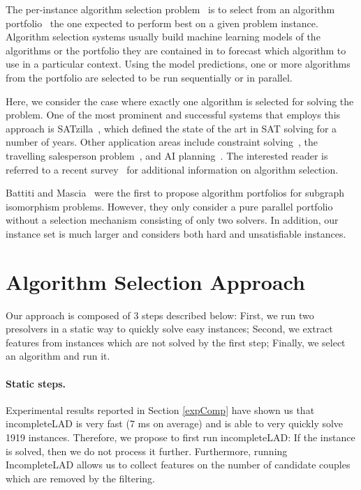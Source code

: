 \documentclass{llncs}
\begin{document}
The per-instance algorithm selection problem~\cite{rice_algorithm_1976} is to select from an
algorithm portfolio~\cite{huberman_economics_1997,gomes_algorithm_2001} the one expected to perform
best on a given problem instance. Algorithm selection systems usually build machine learning models
of the algorithms or the portfolio they are contained in to forecast which algorithm to use in a
particular context. Using the model predictions, one or more algorithms from the portfolio are
selected to be run sequentially or in parallel.

Here, we consider the case where exactly one algorithm is selected for solving the problem. One of
the most prominent and successful systems that employs this approach is
SATzilla~\cite{xu_satzilla_2008}, which defined the state of the art in SAT solving for a number of
years. Other application areas include constraint solving~\cite{omahony_using_2008}, the travelling
salesperson problem~\cite{kotthoff_improving_2015}, and AI planning~\cite{seipp_learning_2012}.
The interested reader is referred to a recent survey~\cite{kotthoff_algorithm_2014} for additional
information on algorithm selection.

\medskip

Battiti and Mascia~\cite{battiti-mascia07} were the first to propose
algorithm portfolios for subgraph isomorphism problems. However, they only
consider a pure parallel portfolio without a selection mechanism consisting of
only two solvers. In addition, our instance set is much larger and considers
both hard and unsatisfiable instances.

\section{Algorithm Selection Approach}

Our approach is composed of 3 steps described below: First, we run two presolvers in a static way to quickly solve easy instances; Second, we extract features from instances which are not solved by the first step; Finally, we select an algorithm and run it.

\paragraph{Static steps.}

Experimental results reported in Section \ref{expComp} have shown us that incompleteLAD is very fast (7 ms on average) and is able to very quickly solve 1919 instances. Therefore, we propose to first run incompleteLAD: If the instance is solved, then we do not process it further. Furthermore, running IncompleteLAD allows us to collect features on the number of candidate couples which are removed by the filtering.
\end{document}
